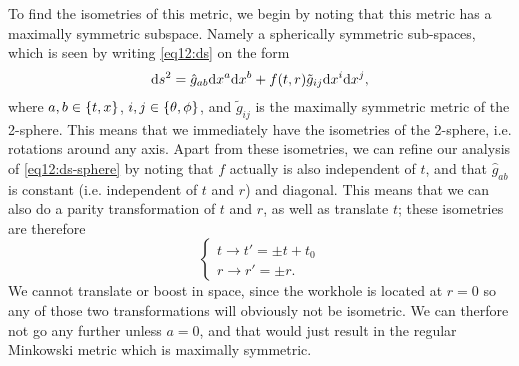 \documentclass[11pt,a4paper, 
swedish, english %
]{article}
\begin{document}
To find the isometries of this metric, we begin by noting that this
metric has a maximally symmetric subspace. Namely a spherically
symmetric sub-spaces, which is seen by writing \eqref{eq12:ds} on the
form 
\begin{equation}\label{eq12:ds-sphere}
\mathrm{d}{s}^2=\hat{g}_{ab}\mathrm{d}{x^a}\mathrm{d}{x^b}
+f(t,r)\tilde{g}_{ij}\mathrm{d}{x^i}\mathrm{d}{x^j},
\end{equation}
where $a,b\in\qty{t,x}$, $i,j\in\qty{\theta,\phi}$, and
$\tilde{g}_{ij}$ is the maximally symmetric metric of the
2-sphere. This means that we immediately have the isometries of the
2-sphere, i.e. rotations around any axis. Apart from these isometries,
we can refine our analysis of \eqref{eq12:ds-sphere} by noting that
$f$ actually is also independent of $t$, and that $\hat{g}_{ab}$ is
constant (i.e. independent of $t$ and $r$) and diagonal. This means
that we can also do a parity transformation of $t$ and $r$, as well as
translate $t$; these isometries are therefore
\begin{equation}
\begin{cases}
t\to t'=\pm t+t_0\\
r\to r'=\pm r.
\end{cases}
\end{equation}
We cannot translate or boost in space, since the workhole is located
at $r=0$ so any of those two transformations will obviously not be
isometric. We can therfore not go any further unless $a=0$, and that
would just result in the regular Minkowski metric which is maximally
symmetric. 





\end{document}
